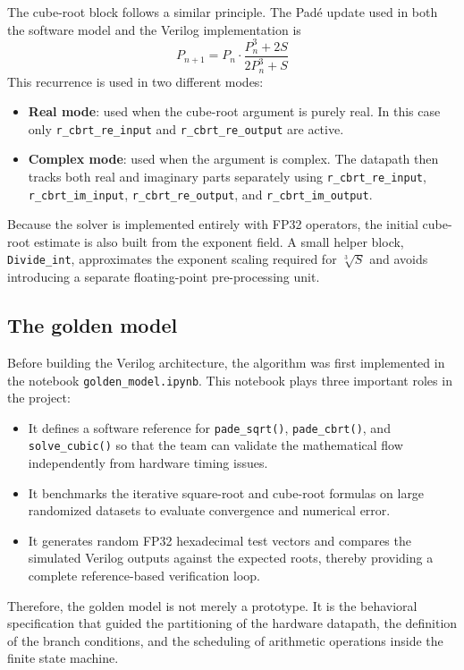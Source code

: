 The cube-root block follows a similar principle. The Pad\'e update used in both the software model and the Verilog implementation is
\begin{equation}
P_{n+1} = P_n \cdot \frac{P_n^3 + 2S}{2P_n^3 + S}
\end{equation}
This recurrence is used in two different modes:
\begin{itemize}
    \item \textbf{Real mode}: used when the cube-root argument is purely real. In this case only \texttt{r\_cbrt\_re\_input} and \texttt{r\_cbrt\_re\_output} are active.
    \item \textbf{Complex mode}: used when the argument is complex. The datapath then tracks both real and imaginary parts separately using \texttt{r\_cbrt\_re\_input}, \texttt{r\_cbrt\_im\_input}, \texttt{r\_cbrt\_re\_output}, and \texttt{r\_cbrt\_im\_output}.
\end{itemize}

Because the solver is implemented entirely with FP32 operators, the initial cube-root estimate is also built from the exponent field. A small helper block, \texttt{Divide\_int}, approximates the exponent scaling required for $\sqrt[3]{S}$ and avoids introducing a separate floating-point pre-processing unit.

\subsection{The golden model}

Before building the Verilog architecture, the algorithm was first implemented in the notebook \texttt{golden\_model.ipynb}. This notebook plays three important roles in the project:
\begin{itemize}
    \item It defines a software reference for \texttt{pade\_sqrt()}, \texttt{pade\_cbrt()}, and \texttt{solve\_cubic()} so that the team can validate the mathematical flow independently from hardware timing issues.
    \item It benchmarks the iterative square-root and cube-root formulas on large randomized datasets to evaluate convergence and numerical error.
    \item It generates random FP32 hexadecimal test vectors and compares the simulated Verilog outputs against the expected roots, thereby providing a complete reference-based verification loop.
\end{itemize}

Therefore, the golden model is not merely a prototype. It is the behavioral specification that guided the partitioning of the hardware datapath, the definition of the branch conditions, and the scheduling of arithmetic operations inside the finite state machine.
